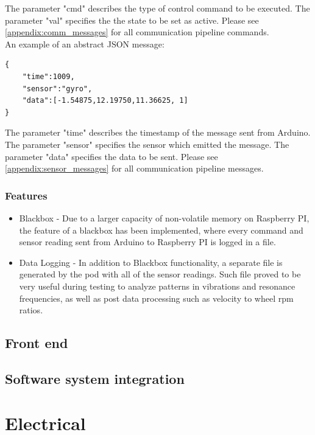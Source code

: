 \documentclass[11pt,a4paper,oldfontcommands]{memoir}
\begin{document}
The parameter "cmd" describes the type of control command to be executed. The parameter "val" specifies the the state to be set as active. Please see \ref{appendix:comm_messages} for all communication pipeline commands.\\

An example of an abstract JSON message:
\bigskip
\begin{lstlisting}
{
    "time":1009,
    "sensor":"gyro",
    "data":[-1.54875,12.19750,11.36625, 1]
}
\end{lstlisting}
\bigskip

The parameter "time" describes the timestamp of the message sent from Arduino. The parameter "sensor" specifies the sensor which emitted the message. The parameter "data" specifies the data to be sent. Please see \ref{appendix:sensor_messages} for all communication pipeline messages.\\

\subsubsection{Features}
\begin{itemize}
    \item Blackbox - Due to a larger capacity of non-volatile memory on Raspberry PI, the feature of a blackbox has been implemented, where every command and sensor reading sent from Arduino to Raspberry PI is logged in a file.
    \item Data Logging - In addition to Blackbox functionality, a separate file is generated by the pod with all of the sensor readings. Such file proved to be very useful during testing to analyze patterns in vibrations and resonance frequencies, as well as post data processing such as velocity to wheel rpm ratios.
\end{itemize}

\subsection{Front end}

\subsection{Software system integration}

\section{Electrical}
\end{document}
